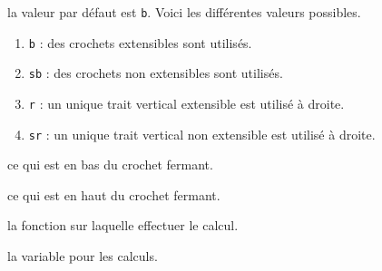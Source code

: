 \documentclass[12pt,a4paper]{article}
\theoremstyle{definition}
\begin{document}
\IDoption{} la valeur par défaut est \verb+b+. Voici les différentes valeurs possibles.
\begin{enumerate}
	\item \verb+b+ : des crochets extensibles sont utilisés.

	\item \verb+sb+ : des crochets non extensibles sont utilisés.

	\item \verb+r+ : un unique trait vertical extensible est utilisé à droite.

	\item \verb+sr+ : un unique trait vertical non extensible est utilisé à droite.
\end{enumerate}

 ce qui est en bas du crochet fermant.

 ce qui est en haut du crochet fermant.

 la fonction sur laquelle effectuer le calcul.

 la variable pour les calculs.
\end{document}
